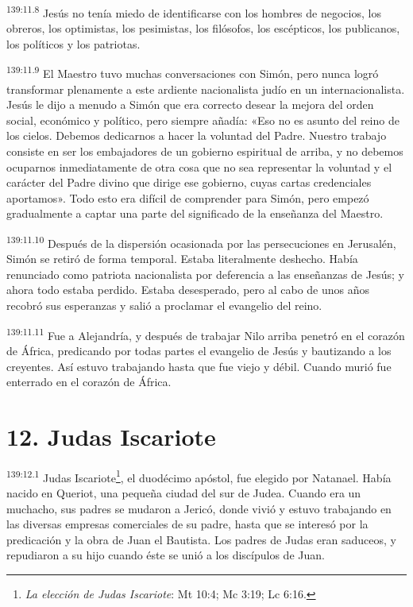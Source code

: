 \par
\textsuperscript{139:11.8} Jesús no tenía miedo de identificarse con los hombres de negocios, los obreros, los optimistas, los pesimistas, los filósofos, los escépticos, los publicanos, los políticos y los patriotas.

\par
\textsuperscript{139:11.9} El Maestro tuvo muchas conversaciones con Simón, pero nunca logró transformar plenamente a este ardiente nacionalista judío en un internacionalista. Jesús le dijo a menudo a Simón que era correcto desear la mejora del orden social, económico y político, pero siempre añadía: «Eso no es asunto del reino de los cielos. Debemos dedicarnos a hacer la voluntad del Padre. Nuestro trabajo consiste en ser los embajadores de un gobierno espiritual de arriba, y no debemos ocuparnos inmediatamente de otra cosa que no sea representar la voluntad y el carácter del Padre divino que dirige ese gobierno, cuyas cartas credenciales aportamos». Todo esto era difícil de comprender para Simón, pero empezó gradualmente a captar una parte del significado de la enseñanza del Maestro.

\par
\textsuperscript{139:11.10} Después de la dispersión ocasionada por las persecuciones en Jerusalén, Simón se retiró de forma temporal. Estaba literalmente deshecho. Había renunciado como patriota nacionalista por deferencia a las enseñanzas de Jesús; y ahora todo estaba perdido. Estaba desesperado, pero al cabo de unos años recobró sus esperanzas y salió a proclamar el evangelio del reino.

\par
\textsuperscript{139:11.11} Fue a Alejandría, y después de trabajar Nilo arriba penetró en el corazón de África, predicando por todas partes el evangelio de Jesús y bautizando a los creyentes. Así estuvo trabajando hasta que fue viejo y débil. Cuando murió fue enterrado en el corazón de África.

\section*{12. Judas Iscariote}
\par
\textsuperscript{139:12.1} Judas Iscariote\footnote{\textit{La elección de Judas Iscariote}: Mt 10:4; Mc 3:19; Lc 6:16.}, el duodécimo apóstol, fue elegido por Natanael. Había nacido en Queriot, una pequeña ciudad del sur de Judea. Cuando era un muchacho, sus padres se mudaron a Jericó, donde vivió y estuvo trabajando en las diversas empresas comerciales de su padre, hasta que se interesó por la predicación y la obra de Juan el Bautista. Los padres de Judas eran saduceos, y repudiaron a su hijo cuando éste se unió a los discípulos de Juan.

